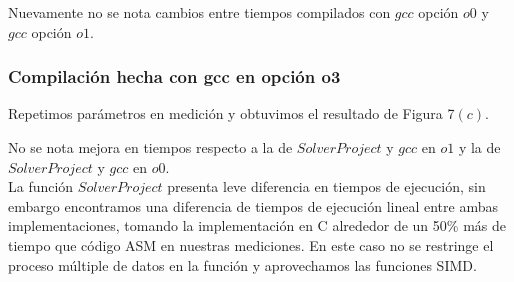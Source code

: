 Nuevamente no se nota cambios entre tiempos compilados con $gcc$ opción $o0$ y $gcc$ opción $o1$. 


\subsubsection{Compilación hecha con gcc en opción o3}
Repetimos parámetros en medición y obtuvimos el resultado de Figura 7$(c)$.
 
No se nota mejora en tiempos respecto a la de $Solver Project$ y $gcc$ en $o1$ y la de $Solver Project$ y $gcc$ en $o0$.
\\


La función $Solver Project$ presenta leve diferencia en tiempos de ejecución, sin embargo encontramos una diferencia de tiempos de ejecución lineal entre ambas implementaciones, tomando la implementación en C alrededor de un 50$\%$ más de tiempo que código ASM en nuestras mediciones. En este caso no se restringe el proceso múltiple de datos en la función y aprovechamos las funciones SIMD.

